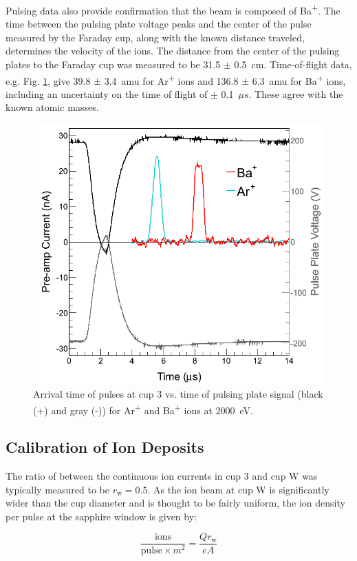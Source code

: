 Pulsing data also provide confirmation that the beam is composed of Ba\textsuperscript{+}.  The time between the pulsing plate voltage peaks and the center of the pulse measured by the Faraday cup, along with the known distance traveled, determines the velocity of the ions.  The distance from the center of the pulsing plates to the Faraday cup was measured to be 31.5 $\pm$ 0.5~cm.  Time-of-flight data, e.g. Fig. \ref{fig:pulses_ArBa}, give 39.8 $\pm$ 3.4~amu for Ar\textsuperscript{+} ions and 136.8 $\pm$ 6.3~amu for Ba\textsuperscript{+} ions, including an uncertainty on the time of flight of $\pm$ 0.1~$\mu s$.  These agree with the known atomic masses.

\begin{figure}[h]
        \centering
                \includegraphics[width=.7\textwidth]{figures/pulses_BaAr.png}
                \caption{Arrival time of pulses at cup 3 vs. time of pulsing plate signal (black (+) and gray (-)) for Ar\textsuperscript{+} and Ba\textsuperscript{+} ions at 2000~eV.}
\label{fig:pulses_ArBa}
\end{figure}

\subsection{Calibration of Ion Deposits}
\label{subsec:ionDepCal}

The ratio of between the continuous ion currents in cup 3 and cup W was typically measured to be $r_{\text{w}} = 0.5$.  As the ion beam at cup W is significantly wider than the cup diameter and is thought to be fairly uniform, the ion density per pulse at the sapphire window is given by:

\begin{equation}
\frac{\text{ions}}{\text{pulse} \times m^{2}} = \frac{Q r_{\text{w}}}{e A}
\label{eqn:ion_density}
\end{equation}

